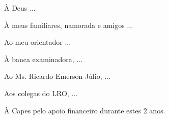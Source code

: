 \begin{agradecimentos}
À Deus ...

À meus familiares, namorada e amigos ...

Ao meu orientador ...

À banca examinadora, ...

Ao Ms. Ricardo Emerson Júlio, ...

Aos colegas do LRO, ...

À Capes pelo apoio financeiro durante estes 2 anos. 

\end{agradecimentos}
\newpage